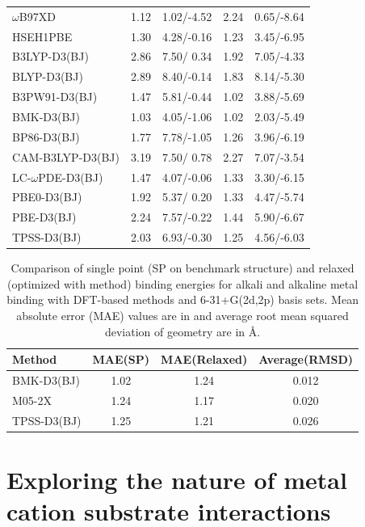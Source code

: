 \begin{longtable}[!htbp]{m{3.1cm} c c | c c}
$\omega$B97XD     &  1.12 &  1.02/-4.52  &  2.24 &  0.65/-8.64 \\
HSEH1PBE          &  1.30 &  4.28/-0.16  &  1.23 &  3.45/-6.95 \\
B3LYP-D3(BJ)      &  2.86 &  7.50/ 0.34  &  1.92 &  7.05/-4.33 \\
BLYP-D3(BJ)       &  2.89 &  8.40/-0.14  &  1.83 &  8.14/-5.30 \\
B3PW91-D3(BJ)     &  1.47 &  5.81/-0.44  &  1.02 &  3.88/-5.69 \\
BMK-D3(BJ)        &  1.03 &  4.05/-1.06  &  1.02 &  2.03/-5.49 \\
BP86-D3(BJ)       &  1.77 &  7.78/-1.05  &  1.26 &  3.96/-6.19 \\
CAM-B3LYP-D3(BJ)  &  3.19 &  7.50/ 0.78  &  2.27 &  7.07/-3.54 \\
LC-$\omega$PDE-D3(BJ)& 1.47 & 4.07/-0.06 &  1.33 &  3.30/-6.15 \\
PBE0-D3(BJ)       &  1.92 &  5.37/ 0.20  &  1.33 &  4.47/-5.74 \\
PBE-D3(BJ)        &  2.24 &  7.57/-0.22  &  1.44 &  5.90/-6.67 \\
TPSS-D3(BJ)       &  2.03 &  6.93/-0.30  &  1.25 &  4.56/-6.03
\end{longtable}

\begin{table}
  \caption[Comparison of single point and relaxed binding energies for alkali and alkaline metal binding with DFT-based methods.]{Comparison of single point (SP on benchmark structure) and relaxed (optimized with method) binding energies for alkali and alkaline metal binding with DFT-based methods and 6-31+G(2d,2p) basis sets. Mean absolute error (MAE) values are in \kcalmol and average root mean squared deviation of geometry are in \AA.}\label{tab:ccsd-metal-opt}
  \begin{tabular}{l c c c}
    Method & MAE(SP) & MAE(Relaxed) & Average(RMSD) \\
    \hline
    BMK-D3(BJ) & 1.02 & 1.24 & 0.012 \\
    M05-2X & 1.24 & 1.17 & 0.020 \\
    TPSS-D3(BJ) & 1.25 & 1.21 & 0.026 \\
  \end{tabular}
\end{table}

\section{Exploring the nature of metal cation substrate interactions}


